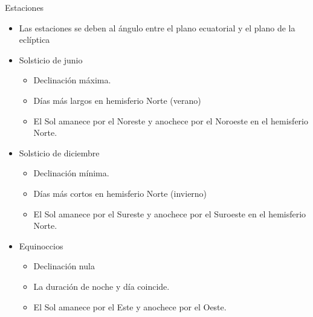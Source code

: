 \documentclass[xcolor={usenames,svgnames,dvipsnames}]{beamer}
\begin{document}
\begin{frame}[label={sec:org74e92b3}]{Estaciones}
\begin{itemize}[<+->]
\item Las estaciones se deben al ángulo entre el plano ecuatorial y el plano de
la eclíptica

\item \alert{Solsticio de junio}
\begin{itemize}[<.->]
\item Declinación máxima.

\item Días más largos en hemisferio Norte (verano)

\item El Sol amanece por el Noreste y anochece por el Noroeste en el
hemisferio Norte.
\end{itemize}

\item \alert{Solsticio de diciembre}
\begin{itemize}[<.->]
\item Declinación mínima.

\item Días más cortos en hemisferio Norte (invierno)

\item El Sol amanece por el Sureste y anochece por el Suroeste en el
hemisferio Norte.
\end{itemize}

\item \alert{Equinoccios}
\begin{itemize}[<.->]
\item Declinación nula

\item La duración de noche y día coincide.

\item El Sol amanece por el Este y anochece por el Oeste.
\end{itemize}
\end{itemize}
\end{frame}
\end{document}
